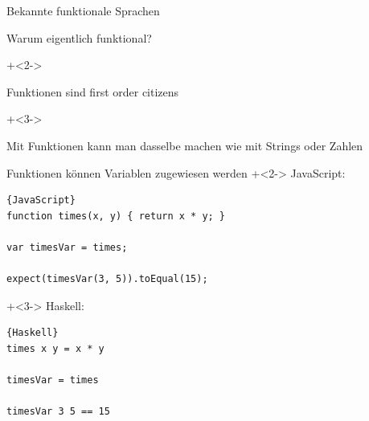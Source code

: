 \begin{frame}[fragile]{Bekannte funktionale Sprachen}

\end{frame}

\begin{frame}[fragile]{Warum eigentlich \glqq{}funktional\grqq{}?}

\onslide+<2->
\begin{center}
\Large
Funktionen sind \glqq{}first order citizens\grqq{}
\end{center}

\vspace{2em}

\onslide+<3->
\begin{center}
Mit Funktionen kann man dasselbe machen wie mit Strings oder Zahlen
\end{center}

\end{frame}

\begin{frame}[fragile]{Funktionen können Variablen zugewiesen werden}
\onslide+<2->
JavaScript:
\begin{lstlisting}{JavaScript}
function times(x, y) { return x * y; }

var timesVar = times;
    
expect(timesVar(3, 5)).toEqual(15);
\end{lstlisting}

\onslide+<3->
Haskell:
\begin{lstlisting}{Haskell}
times x y = x * y

timesVar = times

timesVar 3 5 == 15
\end{lstlisting}

\end{frame}

